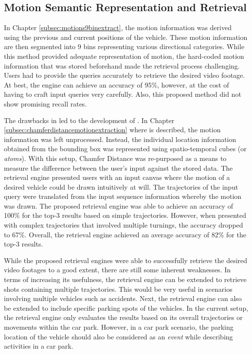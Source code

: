\subsection*{Motion Semantic Representation and Retrieval}
In Chapter \ref{subsec:motions9binextract}, the motion information was derived using the previous and current positions of the vehicle. These motion information are then segmented into 9 bins representing various directional categories. While this method provided adequate representation of motion, the hard-coded motion information that was stored beforehand made the retrieval process challenging. Users had to provide the queries accurately to retrieve the desired video footage. At best, the \versionOneRet engine can achieve an accuracy of 95\%, however, at the cost of having to craft input queries very carefully. Also, this proposed method did not show promising recall rates. 

The drawbacks in \versionOneRet led to the development of \versionTwoRet. In Chapter \ref{subsec:chamferdistancemotionextraction} where \versionTwoRet is described, the motion information was left unprocessed. Instead, the individual location information obtained from the bounding box was represented using spatio-temporal cubes (or \textit{atoms}). With this setup, Chamfer Distance was re-purposed as a means to measure the difference between the user's input against the stored data. The retrieval engine presented users with an input canvas where the motion of a desired vehicle could be drawn intuitively at will. The trajectories of the input query were translated from the input sequence information whereby the motion was drawn. The proposed retrieval engine was able to achieve an accuracy of 100\% for the top-3 results based on simple trajectories. However, when presented with complex trajectories that involved multiple turnings, the accuracy dropped to 67\%. Overall, the retrieval engine achieved an average accuracy of 82\% for the top-3 results.

While the proposed retrieval engines were able to successfully retrieve the desired video footages to a good extent, there are still some inherent weaknesses. In terms of increasing its usefulness, the retrieval engine can be extended to retrieve shots containing multiple trajectories. This would be very useful in scenarios involving multiple vehicles such as accidents. Next, the retrieval engine can also be extended to include specific parking spots of the vehicles. In the current setup, the retrieval engine only evaluates the results based on its overall trajectories or movements within the car park. However, in a car park scenario, the parking location of the vehicle should also be considered as an \emph{event} while describing activities in a car park.

